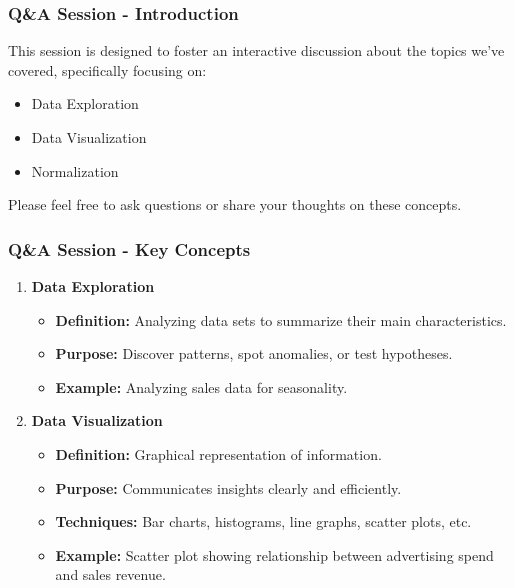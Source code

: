 \documentclass[aspectratio=169]{beamer}
\begin{document}
\begin{frame}[fragile]
  \frametitle{Q\&A Session - Introduction}
  This session is designed to foster an interactive discussion about the topics we've covered, specifically focusing on:
  \begin{itemize}
    \item Data Exploration
    \item Data Visualization
    \item Normalization
  \end{itemize}
  Please feel free to ask questions or share your thoughts on these concepts.
\end{frame}

\begin{frame}[fragile]
  \frametitle{Q\&A Session - Key Concepts}
  \begin{enumerate}
    \item \textbf{Data Exploration}
      \begin{itemize}
        \item \textbf{Definition:} Analyzing data sets to summarize their main characteristics.
        \item \textbf{Purpose:} Discover patterns, spot anomalies, or test hypotheses.
        \item \textbf{Example:} Analyzing sales data for seasonality.
      \end{itemize}
    \item \textbf{Data Visualization}
      \begin{itemize}
        \item \textbf{Definition:} Graphical representation of information.
        \item \textbf{Purpose:} Communicates insights clearly and efficiently.
        \item \textbf{Techniques:} Bar charts, histograms, line graphs, scatter plots, etc.
        \item \textbf{Example:} Scatter plot showing relationship between advertising spend and sales revenue.
      \end{itemize}
  \end{enumerate}
\end{frame}
\end{document}
